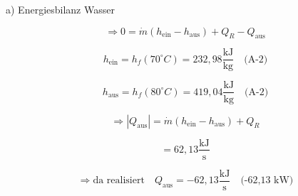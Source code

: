 a) Energiesbilanz Wasser

\[
\Rightarrow 0 = \dot{m} (h_{\text{ein}} - h_{\text{aus}}) + Q_R - Q_{\text{aus}}
\]

\[
h_{\text{ein}} = h_f(70^\circ C) = 232,98 \frac{\text{kJ}}{\text{kg}} \quad \text{(A-2)}
\]

\[
h_{\text{aus}} = h_f(80^\circ C) = 419,04 \frac{\text{kJ}}{\text{kg}} \quad \text{(A-2)}
\]

\[
\Rightarrow |Q_{\text{aus}}| = \dot{m} (h_{\text{ein}} - h_{\text{aus}}) + Q_R
\]

\[
= 62,13 \frac{\text{kJ}}{\text{s}}
\]

\[
\Rightarrow \text{da realisiert} \quad Q_{\text{aus}} = -62,13 \frac{\text{kJ}}{\text{s}} \quad \text{(-62,13 kW)}
\]